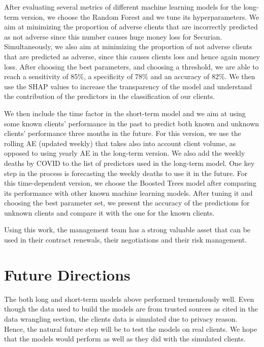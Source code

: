 \documentclass[
]{article}
\begin{document}
After evaluating several metrics of different machine learning models
for the long-term version, we choose the Random Forest and we tune its
hyperparameters. We aim at minimizing the proportion of adverse clients
that are incorrectly predicted as not adverse since this number causes
huge money loss for Securian. Simultaneously, we also aim at minimizing
the proportion of not adverse clients that are predicted as adverse,
since this causes clients loss and hence again money loss. After
choosing the best parameters, and choosing a threshold, we are able to
reach a sensitivity of 85\%, a specificity of 78\% and an accuracy of
82\%. We then use the SHAP values to increase the transparency of the
model and understand the contribution of the predictors in the
classification of our clients.

We then include the time factor in the short-term model and we aim at
using some known clients' performance in the past to predict both known
and unknown clients' performance three months in the future. For this
version, we use the rolling AE (updated weekly) that takes also into
account client volume, as opposed to using yearly AE in the long-term
version. We also add the weekly deaths by COVID to the list of
predictors used in the long-term model. One key step in the process is
forecasting the weekly deaths to use it in the future. For this
time-dependent version, we choose the Boosted Trees model after
comparing its performance with other known machine learning models.
After tuning it and choosing the best parameter set, we present the
accuracy of the predictions for unknown clients and compare it with the
one for the known clients.

Using this work, the management team has a strong valuable asset that
can be used in their contract renewals, their negotiations and their
risk management.

\hypertarget{future-directions}{%
\section{Future Directions}\label{future-directions}}

The both long and short-term models above performed tremendously well.
Even though the data used to build the models are from trusted sources
as cited in the data wrangling section, the clients data is simulated
due to privacy reason. Hence, the natural future step will be to test
the models on real clients. We hope that the models would perform as
well as they did with the simulated clients.
\end{document}
